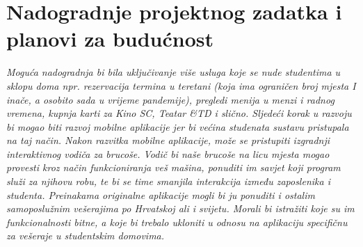 		\section{Nadogradnje projektnog zadatka i planovi za budućnost}
		
			\textit{Moguća nadogradnja bi bila uključivanje više usluga koje se nude studentima u sklopu doma npr.
			rezervacija termina u teretani (koja ima ograničen broj mjesta I inače, a osobito sada u vrijeme
			pandemije), pregledi menija u menzi i radnog vremena, kupnja karti za Kino SC, Teatar \&TD i slično.
			Sljedeći korak u razvoju bi mogao biti razvoj mobilne aplikacije jer bi većina studenata sustavu pristupala
			na taj način. Nakon razvitka mobilne aplikacije, može se pristupiti izgradnji interaktivnog vodiča za
			brucoše. Vodič bi naše brucoše na licu mjesta mogao provesti kroz način funkcioniranja veš mašina,
			ponuditi im savjet koji program služi za njihovu robu, te bi se time smanjila interakcija između
			zaposlenika i studenta.
			Preinakama originalne aplikacije mogli bi ju ponuditi i ostalim samoposlužnim vešerajima po Hrvatskoj
			ali i svijetu. Morali bi istražiti koje su im funkcionalnosti bitne, a koje bi trebalo ukloniti u odnosu na
			aplikaciju specifičnu za vešeraje u studentskim domovima.}